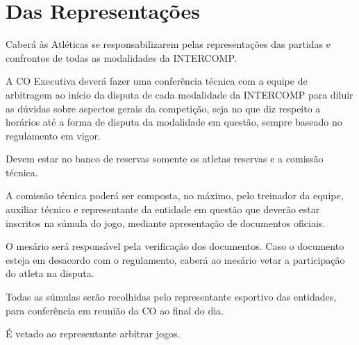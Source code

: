 {\let\clearpage\relax \chapter{Das Representações}}

\begin{article}
	Caberá às Atléticas se responsabilizarem pelas representações das partidas e confrontos de todas as modalidades da INTERCOMP.
\end{article}

\begin{article}
	A CO Executiva deverá fazer uma conferência técnica com a equipe de arbitragem ao início da disputa de cada modalidade da INTERCOMP para diluir as dúvidas sobre aspectos gerais da competição, seja no que diz respeito a horários até a forma de disputa da modalidade em questão, sempre baseado no regulamento em vigor.

	\begin{xparagraph}
		Devem estar no banco de reservas somente os atletas reservas e a comissão técnica.
	\end{xparagraph}

	\begin{xparagraph}
		A comissão técnica poderá ser composta, no máximo, pelo treinador da equipe, auxiliar técnico e representante da entidade em questão que deverão estar inscritos na súmula do jogo, mediante apresentação de documentos oficiais.
	\end{xparagraph}

	\begin{xparagraph}
		O mesário será responsável pela verificação dos documentos. Caso o documento esteja em desacordo com o regulamento, caberá ao mesário vetar a participação do atleta na disputa.
	\end{xparagraph}

	\begin{xparagraph}
		Todas as súmulas serão recolhidas pelo representante esportivo das entidades, para conferência em reunião da CO ao final do dia.
	\end{xparagraph}
\end{article}

\begin{article}
	É vetado ao representante arbitrar jogos.
\end{article}
